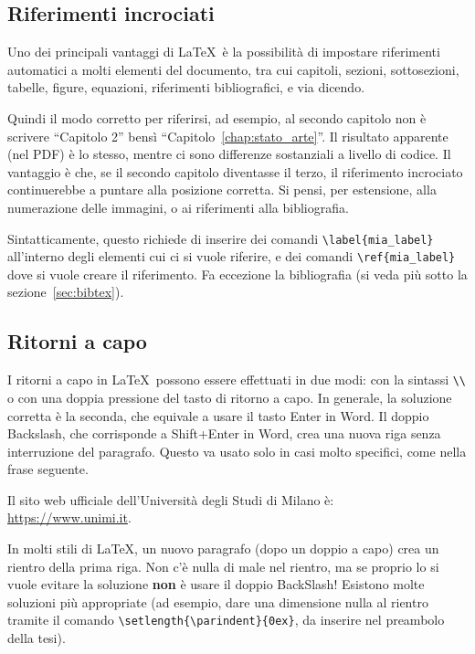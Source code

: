 \documentclass[12pt]{report}
\begin{document}
\subsection{Riferimenti incrociati}

Uno dei principali vantaggi di \LaTeX\ è la possibilità di impostare riferimenti automatici a molti elementi del documento, tra cui capitoli, sezioni, sottosezioni, tabelle, figure, equazioni, riferimenti bibliografici, e via dicendo.

Quindi il modo corretto per riferirsi, ad esempio, al secondo capitolo non è scrivere ``Capitolo 2'' bensì ``Capitolo~\ref{chap:stato_arte}''. Il risultato apparente (nel PDF) è lo stesso, mentre ci sono differenze sostanziali a livello di codice. Il vantaggio è che, se il secondo capitolo diventasse il terzo, il riferimento incrociato continuerebbe a puntare alla posizione corretta. Si pensi, per estensione, alla numerazione delle immagini, o ai riferimenti alla bibliografia.

Sintatticamente, questo richiede di inserire dei comandi \verb|\label{mia_label}| all'interno degli elementi cui ci si vuole riferire, e dei comandi \verb|\ref{mia_label}| dove si vuole creare il riferimento. Fa eccezione la bibliografia (si veda pi\`u sotto la sezione~\ref{sec:bibtex}).


\subsection{Ritorni a capo}

I ritorni a capo in \LaTeX\ possono essere effettuati in due modi: con la sintassi \verb|\\| o con una doppia pressione del tasto di ritorno a capo. In generale, la soluzione corretta è la seconda, che equivale a usare il tasto Enter in Word. Il doppio Backslash, che corrisponde a Shift+Enter in Word, crea una nuova riga senza interruzione del paragrafo. Questo va usato solo in casi molto specifici, come nella frase seguente.

Il sito web ufficiale dell'Università degli Studi di Milano è:\\
\url{https://www.unimi.it}.

In molti stili di \LaTeX, un nuovo paragrafo (dopo un doppio a capo) crea un rientro della prima riga. Non c'\`e nulla di male nel rientro, ma se proprio lo si vuole evitare la soluzione \textbf{non} \`e usare il doppio BackSlash! Esistono molte soluzioni pi\`u appropriate (ad esempio, dare una dimensione nulla al rientro tramite il comando \verb|\setlength{\parindent}{0ex}|, da inserire nel preambolo della tesi).
\end{document}
